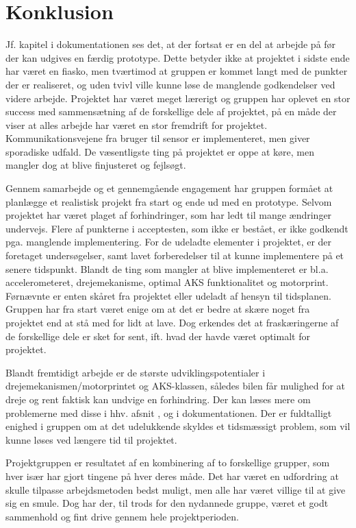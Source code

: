 \chapter{Konklusion}
\label{ch:Konklusion}

Jf. kapitel  i dokumentationen ses det, at der fortsat er en del at arbejde på før der kan udgives en færdig prototype. 
Dette betyder ikke at projektet i sidste ende har været en fiasko, men tværtimod at gruppen er kommet langt med de punkter der er realiseret, og uden tvivl ville kunne løse de manglende godkendelser ved videre arbejde. 
Projektet har været meget lærerigt og gruppen har oplevet en stor success med sammensætning af de forskellige dele af projektet, på en måde der viser at alles arbejde har været en stor fremdrift for projektet. 
Kommunikationsvejene fra bruger til sensor er implementeret, men giver sporadiske udfald. De væsentligste ting på projektet er oppe at køre, men mangler dog at blive finjusteret og fejlsøgt. 

Gennem samarbejde og et gennemgående engagement har gruppen formået at planlægge et realistisk projekt fra start og ende ud med en prototype. Selvom projektet har været plaget af forhindringer, som har ledt til mange ændringer undervejs. 
Flere af punkterne i acceptesten, som ikke er bestået, er ikke godkendt pga. manglende implementering. 
For de udeladte elementer i projektet, er der foretaget undersøgelser, samt lavet forberedelser til at kunne implementere på et senere tidspunkt. 
Blandt de ting som mangler at blive implementeret er bl.a. accelerometeret, drejemekanisme, optimal AKS funktionalitet og motorprint. 
Førnævnte er enten skåret fra projektet eller udeladt af hensyn til tidsplanen. Gruppen har fra start været enige om at det er bedre at skære noget fra projektet end at stå med for lidt at lave. 
Dog erkendes det at fraskæringerne af de forskellige dele er sket for sent, ift. hvad der havde været optimalt for projektet.

Blandt fremtidigt arbejde er de største udviklingspotentialer i drejemekanismen/motorprintet og AKS-klassen, således bilen får mulighed for at dreje og rent faktisk kan undvige en forhindring. 
Der kan læses mere om problemerne med disse i hhv. afsnit ,  og  i dokumentationen. 
Der er fuldtalligt enighed i gruppen om at det udelukkende skyldes et tidsmæssigt problem, som vil kunne løses ved længere tid til projektet.

Projektgruppen er resultatet af en kombinering af to forskellige grupper, som hver især har gjort tingene på hver deres måde. Det har været en udfordring at skulle tilpasse arbejdsmetoden bedst muligt, men alle har været villige til at give sig en smule. Dog har der, til trods for den nydannede gruppe, været et godt sammenhold og fint drive gennem hele projektperioden.

